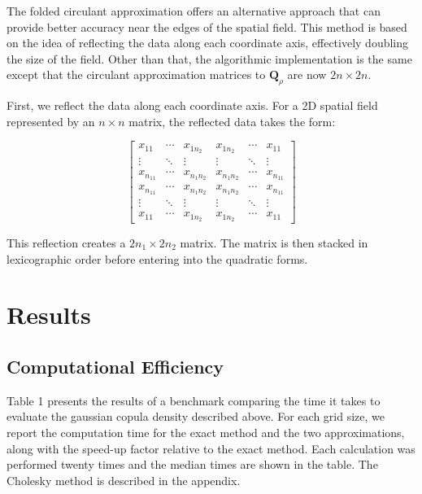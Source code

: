 \documentclass[
  letterpaper,
  DIV=11,
  numbers=noendperiod]{scrartcl}
\begin{document}
The folded circulant approximation offers an alternative approach that
can provide better accuracy near the edges of the spatial field. This
method is based on the idea of reflecting the data along each coordinate
axis, effectively doubling the size of the field. Other than that, the
algorithmic implementation is the same except that the circulant
approximation matrices to \(\mathbf Q_{\rho}\) are now \(2n \times 2n\).

First, we reflect the data along each coordinate axis. For a 2D spatial
field represented by an \(n \times n\) matrix, the reflected data takes
the form:

\[
\begin{bmatrix}
x_{11} & \cdots & x_{1n_2} & x_{1n_2} & \cdots & x_{11} \\
\vdots & \ddots & \vdots & \vdots & \ddots & \vdots \\
x_{n_11} & \cdots & x_{n_1n_2} & x_{n_1n_2} & \cdots & x_{n_11} \\
x_{n_11} & \cdots & x_{n_1n_2} & x_{n_1n_2} & \cdots & x_{n_11} \\
\vdots & \ddots & \vdots & \vdots & \ddots & \vdots \\
x_{11} & \cdots & x_{1n_2} & x_{1n_2} & \cdots & x_{11}
\end{bmatrix}
\]

This reflection creates a \(2n_1 \times 2n_2\) matrix. The matrix is
then stacked in lexicographic order before entering into the quadratic
forms.

\section{Results}\label{results}

\subsection{Computational Efficiency}\label{computational-efficiency}

Table 1 presents the results of a benchmark comparing the time it takes
to evaluate the gaussian copula density described above. For each grid
size, we report the computation time for the exact method and the two
approximations, along with the speed-up factor relative to the exact
method. Each calculation was performed twenty times and the median times
are shown in the table. The Cholesky method is described in the
appendix.
\end{document}
